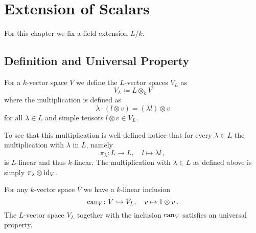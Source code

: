 \chapter{Extension of Scalars}\label{app: extension of scalars}
For this chapter we fix a field extension $L/k$.




\section{Definition and Universal Property}


\begin{definition}
  For a $k$-vector space $V$ we define the $L$-vector spaces $V_L$ as
  \[
    V_L \coloneqq L \otimes_k V
  \]
  where the multiplication is defined as
  \[
      \lambda \cdot (l \otimes v)
    = (\lambda l) \otimes v
  \]
  for all $\lambda \in L$ and simple tensors $l \otimes v \in V_L$.
\end{definition}

To see that this multiplication is well-defined notice that for every $\lambda \in L$ the multiplication with $\lambda$ in $L$, namely
\[
          \pi_\lambda
  \colon  L
  \to     L,
  \quad   l
  \mapsto \lambda l \,,
\]
is $L$-linear and thus $k$-linear.
The multiplication with $\lambda \in L$ as defined above is simply $\pi_\lambda \otimes \operatorname{id}_V$.


For any $k$-vector space $V$ we have a $k$-linear inclusion
\[
                  \operatorname{can}_V
  \colon          V
  \hookrightarrow V_L,
  \quad           v
  \mapsto         1 \otimes v \,.
\]
The $L$-vector space $V_L$ together with the inclusion $\operatorname{can}_V$ satisfies an universal property.


